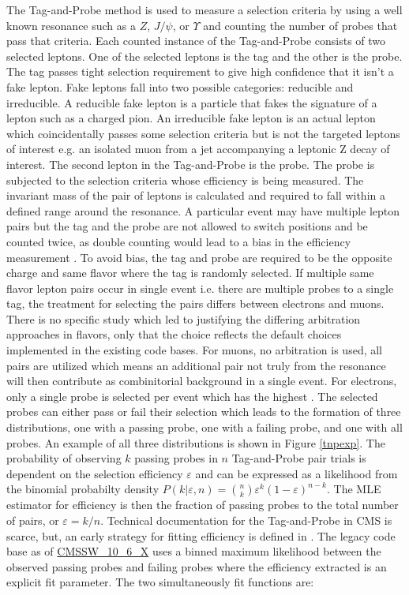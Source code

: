 The Tag-and-Probe method is used to measure a selection criteria by using a well known resonance such as a $Z$, $J/\psi$, or $\Upsilon$ and counting the number of probes that pass that criteria. Each counted instance of the Tag-and-Probe consists of two selected leptons. One of the selected leptons is the tag and the other is the probe.  The tag passes tight selection requirement to give high confidence that it isn't a fake lepton. Fake leptons fall into two possible categories: reducible and irreducible. A reducible fake lepton is a particle that fakes the signature of a lepton such as a charged pion. An irreducible fake lepton is an actual lepton which coincidentally passes some selection criteria but is not the targeted leptons of interest e.g. an isolated muon from a jet accompanying a leptonic Z decay of interest.  The  second lepton in the Tag-and-Probe is the probe. The probe is subjected to the selection criteria whose efficiency is being measured. The invariant mass of the pair of leptons is calculated and required to fall within a defined range around the resonance. A particular event may have multiple lepton pairs but the tag and the probe are not allowed to switch positions and be counted twice, as double counting would lead to a bias in the efficiency measurement \cite{AN111-2009}. To avoid bias, the tag and probe are required to be the opposite charge and same flavor where the tag is randomly selected. If multiple same flavor lepton pairs occur in single event i.e. there are multiple probes to a single tag, the treatment for selecting the pairs differs between electrons and muons. There is no specific study which led to justifying the differing arbitration approaches in flavors, only that the choice reflects the default choices implemented in the existing code bases.  For muons, no arbitration is used, all pairs are utilized which means an additional pair not truly from the resonance will then contribute as combinitorial background in a single event. For electrons, only a single probe is selected per event which has the highest \pt. The selected probes can either pass or fail their selection which leads to the formation of three distributions, one with a passing probe, one with a failing probe, and one with all probes. An example of all three distributions is shown in Figure \ref{tnpexp}.  The probability of observing $k$ passing probes in $n$ Tag-and-Probe pair trials is dependent on the selection efficiency $\varepsilon$ and can be expressed as a likelihood from the binomial probabilty density $P(k|\varepsilon,n) = \binom{n}{k}\varepsilon^k(1-\varepsilon)^{n-k}$. The MLE estimator for efficiency is then the fraction of passing probes to the total number of pairs, or $\varepsilon = k/n$. Technical documentation for the Tag-and-Probe in CMS is scarce, but, an early strategy for fitting efficiency is defined in \cite{Berryhill_2010}. The legacy code base as of \url{CMSSW_10_6_X}  uses a binned maximum likelihood between the observed passing probes and failing probes where the efficiency extracted is an explicit fit parameter. The two simultaneously fit functions are:
